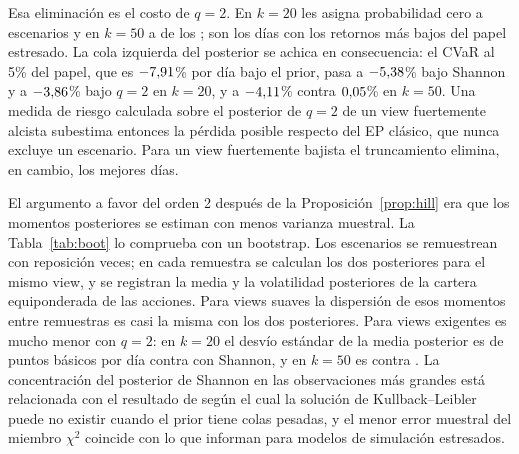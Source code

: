 \documentclass[11pt]{article}
\begin{document}
Esa eliminaci\'on es el costo de $q=2$. En $k=20$ les asigna probabilidad cero a
\nZerosTwenty{} escenarios y en $k=50$ a \nZerosFifty{} de los
\nJ; son los d\'ias con los retornos m\'as bajos del papel estresado. La
cola izquierda del posterior se achica en consecuencia: el CVaR al 5\% del
papel, que es $-7{,}91$\% por d\'ia bajo el prior, pasa a
$-5{,}38$\% bajo Shannon y a $-3{,}86$\% bajo $q=2$ en $k=20$, y
a $-4{,}11$\% contra $0{,}05$\% en $k=50$. Una medida de riesgo
calculada sobre el posterior de $q=2$ de un view fuertemente alcista
subestima entonces la p\'erdida posible respecto del EP cl\'asico, que nunca
excluye un escenario. Para un view fuertemente bajista el truncamiento
elimina, en cambio, los mejores d\'ias.

El argumento a favor del orden 2 despu\'es de la
Proposici\'on~\ref{prop:hill} era que los momentos posteriores se estiman
con menos varianza muestral. La Tabla~\ref{tab:boot} lo comprueba con un
bootstrap. Los escenarios se remuestrean con reposici\'on \nBootReps{}
veces; en cada remuestra se calculan
los dos posteriores para el mismo view, y se registran la media y la
volatilidad posteriores de la cartera equiponderada de las \nN{} acciones.
Para views suaves la dispersi\'on de esos momentos entre remuestras es casi
la misma con los dos posteriores. Para views exigentes es mucho menor con
$q=2$: en $k=20$ el desv\'io est\'andar de la media posterior es de
\nBootSdTTwenty{} puntos b\'asicos por d\'ia contra \nBootSdSTwenty{} con
Shannon, y en $k=50$ es \nBootSdTFifty{} contra \nBootSdSFifty. La
concentraci\'on del posterior de Shannon en las observaciones m\'as grandes
est\'a relacionada con el resultado de \citet{DeyJuneja2012} seg\'un el cual la
soluci\'on de Kullback--Leibler puede no existir cuando el prior tiene colas
pesadas, y el menor error muestral del miembro $\chi^2$ coincide con lo que
\citet{MakamMillossovichTsanakas2021} informan para modelos de simulaci\'on
estresados.

\begin{table}[t]
\centering
\small
\caption{Variabilidad muestral de los momentos posteriores en el
experimento de stress. Desv\'io est\'andar, entre \nBootReps{} remuestras
bootstrap de los escenarios, de la media posterior de la cartera
equiponderada (puntos b\'asicos por d\'ia), y coeficiente de variaci\'on de su
volatilidad posterior, para el view de la Tabla~\ref{tab:stress} en cada
$k$.}
\label{tab:boot}

\end{table}
\end{document}

